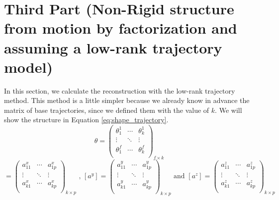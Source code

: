 \section{Third Part (Non-Rigid structure from motion by factorization and assuming a low-rank trajectory model)} 
\noindent In this section, we calculate the reconstruction with the low-rank trajectory method. This method is a little simpler because we already know in advance the matrix of base trajectories, since we defined them with the value of $k$. We will show the structure in Equation \ref{eq:shape_trajectory}.
\begin{equation*}
	\theta=
	\begin{pmatrix}
		\theta_{1}^{1} &  \cdots & \theta_{k}^{1}\\		
		\vdots &  \ddots & \vdots \\
		\theta_{1}^{f} &  \cdots & \theta_{k}^{f}\\		
	\end{pmatrix}_{f\times k}
\end{equation*}
\begin{equation*}
	[a^{x}]=
	\begin{pmatrix}
		a_{11}^{x} &  \cdots & a_{1p}^{x}\\		
		\vdots &  \ddots & \vdots \\
		a_{k1}^{x} &  \cdots & a_{kp}^{x}\\		
	\end{pmatrix}_{k\times p}\text{ , }
	[a^{y}]=
	\begin{pmatrix}
		a_{11}^{y} &  \cdots & a_{1p}^{y}\\		
		\vdots &  \ddots & \vdots \\
		a_{k1}^{y} &  \cdots & a_{kp}^{y}\\		
	\end{pmatrix}_{k\times p}\text{ and }
	[a^{z}]=
	\begin{pmatrix}
		a_{11}^{z} &  \cdots & a_{1p}^{z}\\		
		\vdots &  \ddots & \vdots \\
		a_{k1}^{z} &  \cdots & a_{kp}^{z}\\		
	\end{pmatrix}_{k\times p}
\end{equation*}

